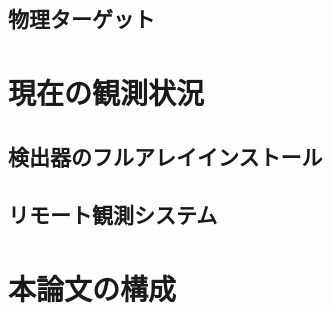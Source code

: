 \subsection{物理ターゲット}

\section{現在の観測状況}

\subsection{検出器のフルアレイインストール}

\subsection{リモート観測システム}

\section{本論文の構成}
